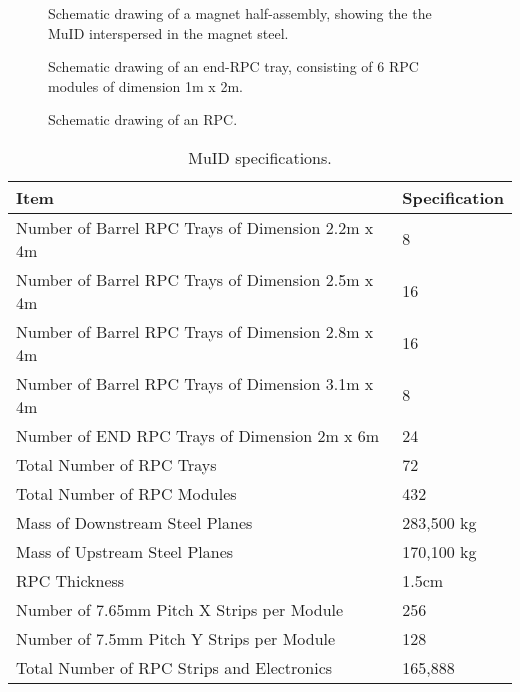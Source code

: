\begin{figure}[htp]
\begin{center}
\caption{\label{FGT_MuID} Schematic drawing of a magnet half-assembly, 
showing the the MuID interspersed in the magnet steel.}
\end{center}
\end{figure}

\begin{figure}[htp]
\begin{center}
\caption{\label{RPC_Tray} Schematic drawing of an end-RPC tray,
consisting of 6 RPC modules of dimension 1m x 2m.}
\end{center}
\end{figure}

\begin{figure}[htp]
\begin{center}
\caption{\label{FGT_RPC} Schematic drawing of an RPC.} 
\end{center}
\end{figure}

\begin{table}
\centering
  \caption{\label{MID_specs} MuID specifications.}
  \begin{tabular}{| l | l |}
    \hline
Item&Specification \\
    \hline
Number of Barrel RPC Trays of Dimension 2.2m x 4m & 8 \\
Number of Barrel RPC Trays of Dimension 2.5m x 4m & 16 \\
Number of Barrel RPC Trays of Dimension 2.8m x 4m & 16 \\
Number of Barrel RPC Trays of Dimension 3.1m x 4m & 8 \\
Number of END RPC Trays of Dimension 2m x 6m & 24 \\
Total Number of RPC Trays & 72 \\
Total Number of RPC Modules & 432 \\
Mass of Downstream Steel Planes & 283,500 kg \\
Mass of Upstream Steel Planes & 170,100 kg \\
RPC Thickness & 1.5cm \\
Number of 7.65mm Pitch X Strips per Module & 256 \\
Number of 7.5mm Pitch Y Strips per Module & 128 \\
Total Number of RPC Strips and Electronics & 165,888 \\
     \hline
  \end{tabular}
\end{table}

